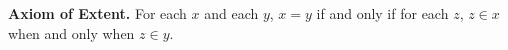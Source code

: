 \textbf{Axiom of Extent.} For each $x$ and each $y$, $x = y$ if and only if for each $z$, $z \in x$ when and only when $z \in y$.

